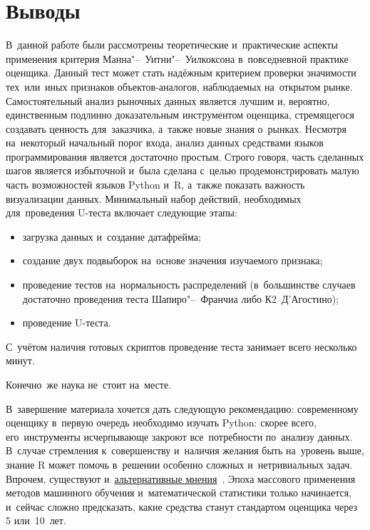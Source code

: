 \documentclass[]{scrreprt}
\begin{document}
\chapter{Выводы}
В~данной работе были рассмотрены теоретические и~практические аспекты применения критерия Манна"--~Уитни"--~Уилкоксона в~повседневной практике оценщика. Данный тест может стать надёжным критерием проверки значимости тех~или~иных признаков объектов-аналогов, наблюдаемых на~открытом рынке. Самостоятельный анализ рыночных данных является лучшим и, вероятно, единственным подлинно доказательным инструментом оценщика, стремящегося создавать ценность для~заказчика, а~также новые знания о~рынках. Несмотря на~некоторый начальный порог входа, анализ данных средствами языков программирования является достаточно простым. Строго говоря, часть сделанных шагов является избыточной и~была сделана с~целью продемонстрировать малую часть возможностей языков Python и~R, а~также показать важность визуализации данных. Минимальный набор действий, необходимых для~проведения U-теста включает следующие этапы:
\begin{itemize}
	\item загрузка данных и~создание датафрейма;
	\item создание двух подвыборок на~основе значения изучаемого признака;
	\item проведение тестов на~нормальность распределений (в~большинстве случаев достаточно проведения теста Шапиро"--~Франчиа либо К2~Д'Агостино);
	\item проведение U-теста.
\end{itemize}
С~учётом наличия готовых скриптов проведение теста занимает всего несколько минут.

Конечно~же наука не~стоит на~месте.

В~завершение материала хочется дать следующую рекомендацию: современному оценщику в~первую очередь необходимо изучать Python: скорее всего, его~инструменты исчерпывающе закроют все~потребности по~анализу данных. В~случае стремления к~совершенству и~наличия желания быть на~уровень выше, знание R может помочь в~решении особенно сложных и~нетривиальных задач. Впрочем, существуют и~\href{https://habr.com/ru/post/670250/}{альтернативные мнения}~\cite{Habr:Python-or-R}. Эпоха массового применения методов машинного обучения и~математической статистики только начинается, и~сейчас сложно предсказать, какие средства станут стандартом оценщика через 5 или~10~лет.

\clearpage

\nocite{Essential-Statistical-Inference}
\nocite{AUC-optimization}
\nocite{Mann-Whitney-1947}
\nocite{Optimizing-classifier-performance}

\printbibliography[title=Источники информации]
\end{document}
